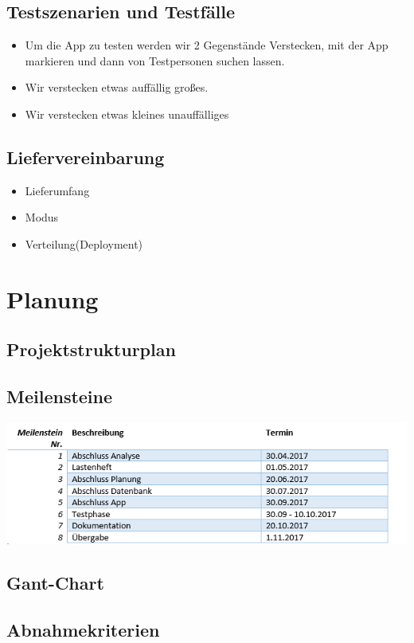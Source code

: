 \subsection{Testszenarien und Testfälle}
\begin{itemize}
	\item Um die App zu testen werden wir 2 Gegenstände Verstecken, mit der App markieren und dann von Testpersonen
	suchen lassen.
	
	\item Wir verstecken etwas auffällig großes.
	\item Wir verstecken etwas kleines unauffälliges
\end{itemize}
\subsection{Liefervereinbarung}
\begin{itemize}
	\item Lieferumfang
	\item Modus
	\item Verteilung(Deployment)
\end{itemize}
\section{Planung}
\subsection{Projektstrukturplan}
\subsection{Meilensteine}
\includegraphics[width=1\linewidth]{Meilensteinplan}\\
\subsection{Gant-Chart}
\subsection{Abnahmekriterien}
